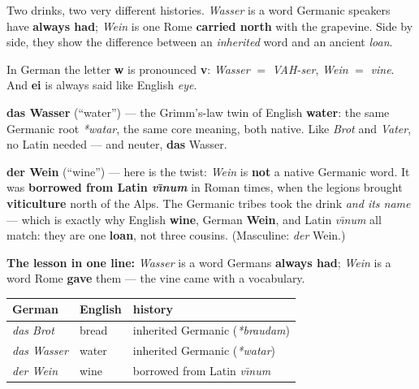 Two drinks, two very different histories. \emph{Wasser} is a word Germanic
speakers have \textbf{always had}; \emph{Wein} is one Rome \textbf{carried
north} with the grapevine. Side by side, they show the difference between an
\emph{inherited} word and an ancient \emph{loan}.

\begin{sounds}
In German the letter \textbf{w} is pronounced \textbf{v}: \emph{Wasser} $=$
\emph{VAH-ser}, \emph{Wein} $=$ \emph{vine}. And \textbf{ei} is always said
like English \emph{eye}.
\end{sounds}

\begin{cousinweb}
\textbf{das Wasser} (``water'') --- the Grimm's-law twin of English
\textbf{water}: the same Germanic root \emph{*watar}, the same core meaning,
both native. Like \emph{Brot} and \emph{Vater}, no Latin needed --- and neuter,
\textbf{das} Wasser.
\end{cousinweb}

\begin{etymology}
\textbf{der Wein} (``wine'') --- here is the twist: \emph{Wein} is \textbf{not}
a native Germanic word. It was \textbf{borrowed from Latin \emph{v\={\i}num}}
in Roman times, when the legions brought \textbf{viticulture} north of the
Alps. The Germanic tribes took the drink \emph{and its name} --- which is
exactly why English \textbf{wine}, German \textbf{Wein}, and Latin
\emph{v\={\i}num} all match: they are one \textbf{loan}, not three cousins.
(Masculine: \emph{der} Wein.)
\end{etymology}

\begin{culture}
\textbf{The lesson in one line:} \emph{Wasser} is a word Germans \textbf{always
had}; \emph{Wein} is a word Rome \textbf{gave} them --- the vine came with a
vocabulary.
\end{culture}

\begin{center}
\begin{tabular}{@{}lll@{}}
\toprule
German & English & history \\
\midrule
\emph{das Brot} & bread & inherited Germanic (\emph{*braudam}) \\
\emph{das Wasser} & water & inherited Germanic (\emph{*watar}) \\
\emph{der Wein} & wine & borrowed from Latin \emph{v\={\i}num} \\
\bottomrule
\end{tabular}
\end{center}
